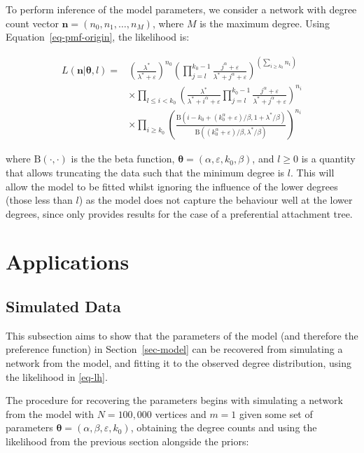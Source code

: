 \documentclass[
  sn-basic,
]{sn-jnl}
\theoremstyle{plain}
\theoremstyle{plain}
\theoremstyle{remark}
\begin{document}
\newpage

To perform inference of the model parameters, we consider a network with
degree count vector \(\pmb n = (n_0, n_1, \ldots, n_M)\), where \(M\) is
the maximum degree. Using Equation~\ref{eq-pmf-origin}, the likelihood
is:

\begin{align*}
L(\pmb n | \pmb \theta,l) = &\left(\frac{\lambda^*}{\lambda^*+\varepsilon}\right)^{n_0}\left(\prod_{j=l}^{k_0-1}\frac{j^\alpha +\varepsilon}{\lambda^* + j^\alpha +\varepsilon}\right)^{\left(\sum_{i\ge k_0}n_{i}\right)} \\ &\times \prod_{l \le i<k_0}\left(\frac{\lambda^*}{\lambda^* +i^\alpha + \varepsilon } \prod_{j=l}^{k_0-1}\frac{j^\alpha + \varepsilon}{\lambda^* + j^\alpha + \varepsilon}\right)^{n_i}\\ &\times \prod_{i\ge k_0}\left(\frac{\text{B}(i-k_0 + (k_0^\alpha + \varepsilon)/\beta,1+\lambda^*/\beta)}{\text{B}((k_0^\alpha + \varepsilon)/\beta,\lambda^*/\beta)}\right)^{n_i}
\end{align*}\label{eq-lh}

where \(\text{B}(\cdot,\cdot)\) is the the beta function,
\(\pmb \theta = (\alpha, \varepsilon, k_0,\beta)\), and \(l\ge0\) is a
quantity that allows truncating the data such that the minimum degree is
\(l\). This will allow the model to be fitted whilst ignoring the
influence of the lower degrees (those less than \(l\)) as the model does
not capture the behaviour well at the lower degrees, since
\citet{rudas07} only provides results for the case of a preferential
attachment tree.

\section{Applications}\label{applications}

\subsection{Simulated Data}\label{sec-sim}

This subsection aims to show that the parameters of the model (and
therefore the preference function) in Section~\ref{sec-model} can be
recovered from simulating a network from the model, and fitting it to
the observed degree distribution, using the likelihood in \eqref{eq-lh}.

The procedure for recovering the parameters begins with simulating a
network from the model with \(N=100,000\) vertices and \(m=1\) given
some set of parameters
\(\pmb\theta = (\alpha, \beta, \varepsilon, k_0)\), obtaining the degree
counts and using the likelihood from the previous section alongside the
priors:
\end{document}
